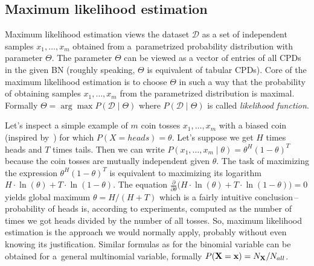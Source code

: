 \documentclass[english,cover]{fitthesis} %
\newcommand{\term}[1]{\emph{#1}}           %
\newcommand{\vars}[1]{{\bold{#1}}}         %
\begin{document}
\subsection{Maximum likelihood estimation}
Maximum likelihood estimation views the dataset $\mathcal{D}$ as a set of independent samples $x_1, \dots, x_m$ obtained from a~parametrized probability distribution with parameter $\Theta$. The parameter $\Theta$ can be viewed as a vector of entries of all CPDs in the given BN (roughly speaking, $\Theta$ is  equivalent of tabular CPDs). Core of the maximum likelihood estimation is to choose $\Theta$ in such a way that the probability of obtaining samples $x_1, \dots, x_m$ from the parametrized distribution is maximal. Formally $\Theta = \arg \max P(\mathcal{D} \mid \Theta)$ where $P(\mathcal{D} \mid \Theta)$ is called \term{likelihood function}.

Let's inspect a simple example of $m$ coin tosses $x_1, \dots, x_m$ with a biased coin (inspired by~\cite{pgm}) for which $P(X = heads) = \theta$. Let's suppose we get $H$ times heads and $T$ times tails. Then we can write $P(x_1,\dots,x_m \mid \theta) = \theta^H (1 - \theta)^T$ because the coin tosses are mutually independent given $\theta$. The task of maximizing the expression $\theta^H (1 - \theta)^T$ is equivalent to maximizing its logarithm $H \cdot \ln(\theta) + T \cdot \ln(1 - \theta)$. The equation $\frac{\partial}{\partial\theta} \bigl( H \cdot \ln(\theta) + T \cdot \ln(1 - \theta) \bigr) = 0$ yields global maximum $\theta = H / (H + T)$ which is a fairly intuitive conclusion\,--\,probability of heads is, according to experiments, computed as the number of times we got heads divided by the number of all tosses. So, maximum likelihood estimation is the approach we would normally apply, probably without even knowing its justification. Similar formulas as for the binomial variable can be obtained for a~general multinomial variable, formally $P(\vars{X}=\vars{x}) = N_\vars{X} / N_{all}$.
\end{document}

